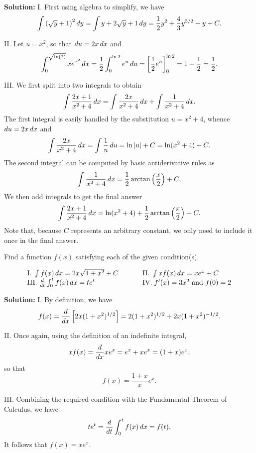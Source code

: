 \documentclass[handout,hints]{ximera}
\begin{document}
\textbf{Solution:} I. First using algebra to simplify, we have
$$
\int \left(\sqrt{y}+1\right)^2 \mathop{}\!d y = \int y + 2 \sqrt{y} + 1 \mathop{}\!d y = \frac{1}{2}y^2 + \frac{4}{3} y^{3/2} + y + C.
$$

II. Let $u = x^2$, so that $\mathop{}\!d u = 2 x \mathop{}\!d x$ and 
$$
\int_0^{\sqrt{\ln(2)}} x e^{x^2} \mathop{}\!d x = \frac{1}{2} \int_0 ^{\ln 2} e^u \mathop{}\!d u = \bigg[ \frac{1}{2} e^u \bigg]_0^{\ln 2} = 1- \frac{1}{2} = \frac{1}{2}.
$$

III. We first split into two integrals to obtain 
$$
\int \frac{2x+1}{x^2+4} \mathop{}\!d x = \int \frac{2x}{x^2 + 4} \mathop{}\!d x + \int \frac{1}{x^2 + 4} \mathop{}\!d x.
$$
The first integral is easily handled by the substitution $u = x^2 + 4$, whence $\mathop{}\!d u = 2 x \mathop{}\!d x$ and 
$$
\int \frac{2x}{x^2 + 4} \mathop{}\!d x = \int \frac{1}{u} \mathop{}\!d u = \ln |u| + C = \ln (x^2 + 4) + C.
$$
The second integral can be computed by basic antiderivative rules as 
$$
\int \frac{1}{x^2 + 4} \mathop{}\!d x = \frac{1}{2} \arctan \left(\frac{x}{2}\right) + C.
$$
We then add integrals to get the final answer
$$
\int \frac{2x+1}{x^2+4} \mathop{}\!d x = \ln (x^2 + 4) + \frac{1}{2} \arctan \left(\frac{x}{2}\right) + C.
$$
Note that, because $C$ represents an arbitrary constant, we only need to include it once in the final answer.

\begin{problem}
Find a function $f(x)$ satisfying each of the given condition(s).

$$
\begin{array}{lll}
\mathrm{I.} \; \int f(x) \mathop{}\!d x = 2x \sqrt{1+ x^2} + C & \hspace{.2in} & \mathrm{II.} \; \int xf(x) \mathop{}\!d x = x e^x + C \\
\mathrm{III.} \; \frac{\mathop{}\!d}{\mathop{}\!d t} \int_0^t f(x) \mathop{}\!d x = t e^t & \hspace{.2in} & \mathrm{IV.} \; f'(x) = 3x^2 \mbox{ and } f(0)=2
\end{array}
$$
\end{problem}

\textbf{Solution:} I. By definition, we have
$$
f(x) = \frac{\mathop{}\!d}{\mathop{}\!d x}  \left[2x (1+ x^2)^{1/2}\right] = 2(1+x^2)^{1/2} + 2x  (1+x^2)^{-1/2}.
$$

II. Once again, using the definition of an indefinite integral, 
$$
x f(x) = \frac{\mathop{}\!d}{\mathop{}\!d x} x e^x = e^x + x e^x = (1+x)e^x,
$$
so that 
$$
f(x) = \frac{1+x}{x} e^x.
$$

III. Combining the required condition with the Fundamental Theorem of Calculus, we have
$$
te^t = \frac{\mathop{}\!d}{\mathop{}\!d t} \int_0^t f(x) \mathop{}\!d x = f(t).
$$
It follows that $f(x) = x e^x$.
\end{document}
